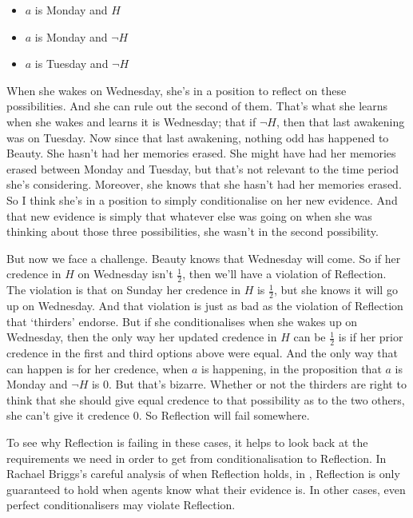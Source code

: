 \begin{itemize}
\item \(a\) is Monday and \(H\)
\item \(a\) is Monday and \(\neg H\)
\item \(a\) is Tuesday and \(\neg H\)
\end{itemize}

\noindent When she wakes on Wednesday, she's in a position to reflect on these possibilities. And she can rule out the second of them. That's what she learns when she wakes and learns it is Wednesday; that if \(\neg H\), then that last awakening was on Tuesday. Now since that last awakening, nothing odd has happened to Beauty. She hasn't had her memories erased. She might have had her memories erased between Monday and Tuesday, but that's not relevant to the time period she's considering. Moreover, she knows that she hasn't had her memories erased. So I think she's in a position to simply conditionalise on her new evidence. And that new evidence is simply that whatever else was going on when she was thinking about those three possibilities, she wasn't in the second possibility.

But now we face a challenge. Beauty knows that Wednesday will come. So if her credence in \(H\) on Wednesday isn't \(\frac{1}{2}\), then we'll have a violation of Reflection. The violation is that on Sunday her credence in \(H\) is \(\frac{1}{2}\), but she knows it will go up on Wednesday. And that violation is just as bad as the violation of Reflection that `thirders' endorse. But if she conditionalises when she wakes up on Wednesday, then the only way her updated credence in \(H\) can be \(\frac{1}{2}\) is if her prior credence in the first and third options above were equal. And the only way that can happen is for her credence, when \(a\) is happening, in the proposition that \(a\) is Monday and \(\neg H\) is 0. But that's bizarre. Whether or not the thirders are right to think that she should give equal credence to that possibility as to the two others, she can't give it credence 0. So Reflection will fail somewhere.

To see why Reflection is failing in these cases, it helps to look back at the requirements we need in order to get from conditionalisation to Reflection. In Rachael Briggs's careful analysis of when Reflection holds, in \citet{Briggs2009}, Reflection is only guaranteed to hold when agents know what their evidence is. In other cases, even perfect conditionalisers may violate Reflection. 

